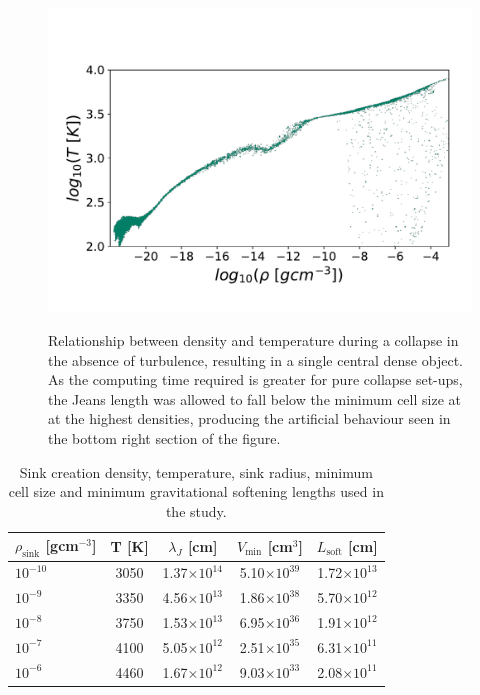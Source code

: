 \documentclass[fleqn,usenatbib]{mnras}
\begin{document}
\begin{figure}
	\hbox{\hspace{-0.8cm} \includegraphics[scale=0.6]{simple.pdf}}
    \caption{Relationship between density and temperature during a collapse in the absence of turbulence, resulting in a single central dense object. As the computing time required is greater for pure collapse set-ups, the Jeans length was allowed to fall below the minimum cell size at at the highest densities, producing the artificial behaviour seen in the bottom right section of the figure.}
    \label{fig:simple}
\end{figure}

\begin{table}
	\centering
	\caption{Sink creation density, temperature, sink radius, minimum cell size and minimum gravitational softening lengths used in the study.}
	\label{table:1}
	\begin{tabular}{lcccr} %
		\hline
		$\rho_{\text{sink}}$ [gcm$^{-3}$] & T [K] & $\lambda_J$ [cm] & $V_{\text{min}}$ [cm$^{3}$] & $L_{\text{soft}}$ [cm]\\
		\hline
		$10^{-10}$ & 3050 & 1.37$\times 10^{14}$ & 5.10$\times 10^{39}$ & 1.72$\times 10^{13}$\\
		$10^{-9}$ & 3350 & 4.56$\times 10^{13}$ & 1.86$\times 10^{38}$ & 5.70$\times 10^{12}$\\
		$10^{-8}$ & 3750 & 1.53$\times 10^{13}$ & 6.95$\times 10^{36}$ & 1.91$\times 10^{12}$\\
		$10^{-7}$ & 4100 & 5.05$\times 10^{12}$ & 2.51$\times 10^{35}$ & 6.31$\times 10^{11}$\\
		$10^{-6}$ & 4460 & 1.67$\times 10^{12}$  & 9.03$\times 10^{33}$ &  2.08$\times 10^{11}$\\
		\hline
	\end{tabular}
\end{table}
\end{document}
